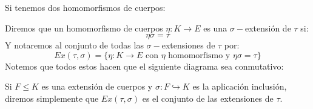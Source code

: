 \begin{definicion}
    Si tenemos dos homomorfismos de cuerpos:
    \begin{figure}[H]
        \centering
    \end{figure}
    \noindent
    Diremos que un homomorfismo de cuerpos $\eta:K\to E$ es una $\sigma-$extensión de $\tau$ si:
    \begin{equation*}
        \eta\sigma = \tau
    \end{equation*}
    \noindent
    Y notaremos al conjunto de todas las $\sigma-$extensiones de $\tau$ por:
    \begin{equation*}
        Ex(\tau,\sigma) = \{\eta:K\to E \text{\ con\ } \eta \text{\ homomorfismo y\ } \eta \sigma = \tau\}
    \end{equation*}
    Notemos que todos estos hacen que el siguiente diagrama sea conmutativo:
    \begin{figure}[H]
        \centering
    \end{figure}
    \noindent
    Si $F\leq K$ es una extensión de cuerpos y $\sigma:F\hookrightarrow K$ es la aplicación inclusión, diremos simplemente que $Ex(\tau,\sigma)$ es el conjunto de las extensiones de $\tau$.
\end{definicion}

